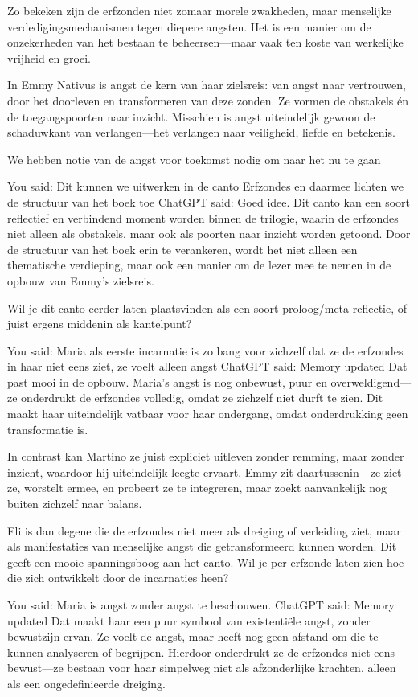 Zo bekeken zijn de erfzonden niet zomaar morele zwakheden, maar menselijke verdedigingsmechanismen tegen diepere angsten. Het is een manier om de onzekerheden van het bestaan te beheersen—maar vaak ten koste van werkelijke vrijheid en groei.

In Emmy Nativus is angst de kern van haar zielsreis: van angst naar vertrouwen, door het doorleven en transformeren van deze zonden. Ze vormen de obstakels én de toegangspoorten naar inzicht. Misschien is angst uiteindelijk gewoon de schaduwkant van verlangen—het verlangen naar veiligheid, liefde en betekenis.

We hebben notie van de angst voor toekomst nodig om naar het nu te gaan

You said:
Dit kunnen we uitwerken in de canto Erfzondes en daarmee lichten we de structuur van het boek toe
ChatGPT said:
Goed idee. Dit canto kan een soort reflectief en verbindend moment worden binnen de trilogie, waarin de erfzondes niet alleen als obstakels, maar ook als poorten naar inzicht worden getoond. Door de structuur van het boek erin te verankeren, wordt het niet alleen een thematische verdieping, maar ook een manier om de lezer mee te nemen in de opbouw van Emmy’s zielsreis.

Wil je dit canto eerder laten plaatsvinden als een soort proloog/meta-reflectie, of juist ergens middenin als kantelpunt?

You said:
Maria als eerste incarnatie is zo bang voor zichzelf dat ze de erfzondes in haar niet eens ziet, ze voelt alleen angst
ChatGPT said:
Memory updated
Dat past mooi in de opbouw. Maria's angst is nog onbewust, puur en overweldigend—ze onderdrukt de erfzondes volledig, omdat ze zichzelf niet durft te zien. Dit maakt haar uiteindelijk vatbaar voor haar ondergang, omdat onderdrukking geen transformatie is.

In contrast kan Martino ze juist expliciet uitleven zonder remming, maar zonder inzicht, waardoor hij uiteindelijk leegte ervaart. Emmy zit daartussenin—ze ziet ze, worstelt ermee, en probeert ze te integreren, maar zoekt aanvankelijk nog buiten zichzelf naar balans.

Eli is dan degene die de erfzondes niet meer als dreiging of verleiding ziet, maar als manifestaties van menselijke angst die getransformeerd kunnen worden. Dit geeft een mooie spanningsboog aan het canto. Wil je per erfzonde laten zien hoe die zich ontwikkelt door de incarnaties heen?

You said:
Maria is angst zonder angst te beschouwen.
ChatGPT said:
Memory updated
Dat maakt haar een puur symbool van existentiële angst, zonder bewustzijn ervan. Ze voelt de angst, maar heeft nog geen afstand om die te kunnen analyseren of begrijpen. Hierdoor onderdrukt ze de erfzondes niet eens bewust—ze bestaan voor haar simpelweg niet als afzonderlijke krachten, alleen als een ongedefinieerde dreiging.

